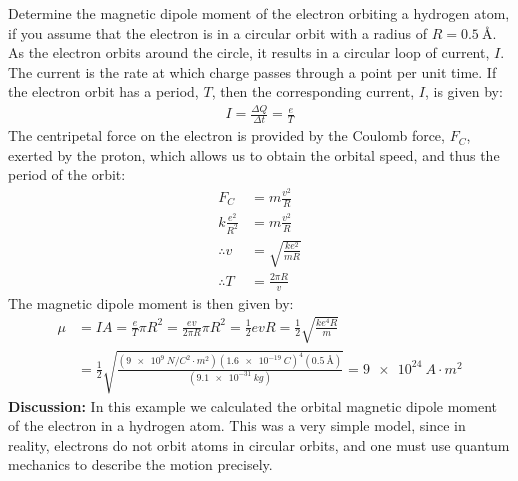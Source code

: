 \begin{example}{Determine the magnetic dipole moment of the electron orbiting a hydrogen atom, if you assume that the electron is in a circular orbit with a radius of $R=\SI{0.5}{\angstrom}$.}
As the electron orbits around the circle, it results in a circular loop of current, $I$. The current is the rate at which charge passes through a point per unit time. If the electron orbit has a period, $T$, then the corresponding current, $I$, is given by:
\begin{align*}
I=\frac{\Delta Q}{\Delta t} = \frac{e}{T}
\end{align*}
The centripetal force on the electron is provided by the Coulomb force, $F_C$, exerted by the proton, which allows us to obtain the orbital speed, and thus the period of the orbit:
\begin{align*}
F_C &= m\frac{v^2}{R}\\
k\frac{e^2}{R^2}&= m\frac{v^2}{R}\\
\therefore v &=\sqrt{\frac{ke^2}{mR}}\\
\therefore T &= \frac{2\pi R}{v}
\end{align*}
The magnetic dipole moment is then given by:
\begin{align*}
\mu &= IA = \frac{e}{T} \pi R^2 = \frac{ev}{2\pi R} \pi R^2=\frac{1}{2} evR=\frac{1}{2} \sqrt{\frac{ke^4R}{m}}\\
&=\frac{1}{2} \sqrt{\frac{(\SI{9e9}{N/C^{2}\cdot m^2})(\SI{1.6e-19}{C})^4(\SI{0.5}{\angstrom})}{(\SI{9.1e-31}{kg})}}=\SI{9e24}{A\cdot m^2}
\end{align*}
\textbf{Discussion:} In this example we calculated the orbital magnetic dipole moment of the electron in a hydrogen atom. This was a very simple model, since in reality, electrons do not orbit atoms in circular orbits, and one must use quantum mechanics to describe the motion precisely. 
\end{example}


